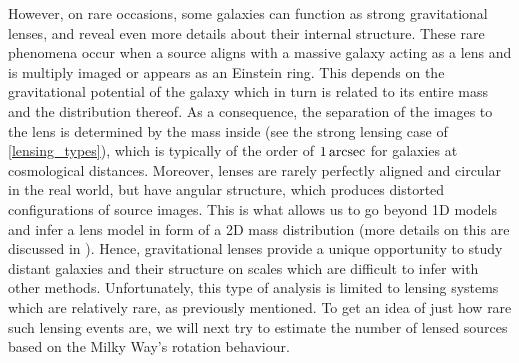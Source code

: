 However, on rare occasions, some galaxies can function as strong gravitational
lenses, and reveal even more details about their internal structure.  These rare
phenomena occur when a source aligns with a massive galaxy acting as a lens and
is multiply imaged or appears as an Einstein ring.  This depends on the
gravitational potential of the galaxy which in turn is related to its entire
mass and the distribution thereof.  As a consequence, the separation of the
images to the lens is determined by the mass inside (see the strong lensing case
of \eqref{lensing_types}), which is typically of the order of $1\,\mathrm{arcsec}$ for
galaxies at cosmological distances.  Moreover, lenses are rarely perfectly
aligned and circular in the real world, but have angular structure, which
produces distorted configurations of source images.  This is what allows us to
go beyond 1D models and infer a lens model in form of a 2D mass distribution
(more details on this are discussed in ).  Hence, gravitational
lenses provide a unique opportunity to study distant galaxies and their
structure on scales which are difficult to infer with other methods.
Unfortunately, this type of analysis is limited to lensing systems which are
relatively rare, as previously mentioned.  To get an idea of just how rare such
lensing events are, we will next try to estimate the number of lensed sources
based on the Milky Way's rotation behaviour.

